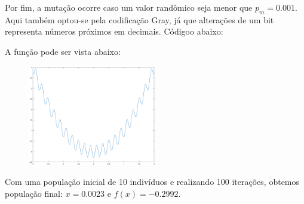 \documentclass[12pt]{article}
\newenvironment{exercise}[2][Exercício]{\begin{trivlist}
\item[\hskip \labelsep {\bfseries #1}\hskip \labelsep {\bfseries #2.}]}{\end{trivlist}}
\begin{document}
\begin{exercise}{1}
Por fim, a mutação ocorre caso um valor randômico seja menor que $p_m = 0.001$.
Aqui também optou-se pela codificação Gray, já que alterações de um bit
representa números próximos em decimais. Códigoo abaixo:


A função pode ser vista abaixo:
\begin{figure}[H]
    \centering
    \includegraphics[width=0.5\textwidth]{figs/ex1.eps}
\end{figure}
\end{exercise}

Com uma população inicial de 10 indivíduos e realizando 100 iterações, obtemos
população final: $x = 0.0023$ e $f(x) = -0.2992$.
\end{document}

